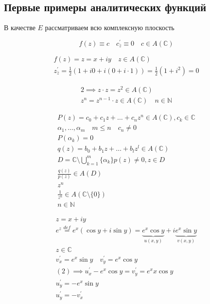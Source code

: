 \documentclass[main]{subfiles}
\begin{document}
\subsection*{Первые примеры аналитических функций}
В качестве $E$ рассматриваем всю комплексную плоскость
\begin{example}
    \[ f(z) \equiv c \quad c^\prime_{\overline{z}} \equiv 0 \quad c \in A(\mathbb{C}) \]
\end{example}
\begin{example}
    \begin{gather*}
        f(z) = z = x +iy \quad z \in A(\mathbb{C}) \\
        z^\prime_{\overline{z}} = \frac{1}{2} (1 + i0 + i(0 + i \cdot 1)) = \frac{1}{2}(1+ i^2) = 0
    \end{gather*}
\end{example}
\begin{example}
    \begin{gather*}
        2 \implies z \cdot z = z^2 \in A(\mathbb{C}) \\
        z^n = z^{n-1} \cdot z \in A(\mathbb{C}) \quad n \in \mathbb{N} 
    \end{gather*}
\end{example}
\begin{example}
    \begin{gather*}
        P(z) = c_0 + c_1z + \ldots + c_nz^n \in A(\mathbb{C}), c_k \in \mathbb{C} \\
        \alpha_1, \ldots, \alpha_m \quad m \leq n \quad c_n \ne 0 \\
        P(\alpha_k) = 0 \\
        q(z) = b_0 + b_1z + \ldots + b_lz^l \in A(\mathbb{C}) \\
        D = \mathbb{C} \setminus \bigcup^m_{k=1} \{ \alpha_k \}
        p(z) \ne 0, z \in D \\
        \frac{q(z)}{p(z)} \in A(D) \\
        z^n \\
        \frac{1}{z^n} \in A (\mathbb{C} \setminus \{ 0 \}) \\
        n \in \mathbb{N}
    \end{gather*}
\end{example}
\begin{example}
    \begin{gather*}
        z = x + iy\\
        e^z \stackrel{def}{=} e^x(\cos y + i \sin y) = \underbrace{e^x \cos y}_{u(x,y)} + i \underbrace{e^x \sin y}_{v(x,y)} \tag{2} \\
        z \in \mathbb{C} \\
        v^\prime_x = e^x \sin y \quad v^\prime_y = e^x \cos y \\
        (2) \implies  u^\prime_x - e^x \cos y = v^\prime_y = e^xx \cos y \\
        u^\prime_y = -e^x \sin y \\
        u^\prime_y = -v^\prime_x
    \end{gather*}
\end{example}
\end{document}
